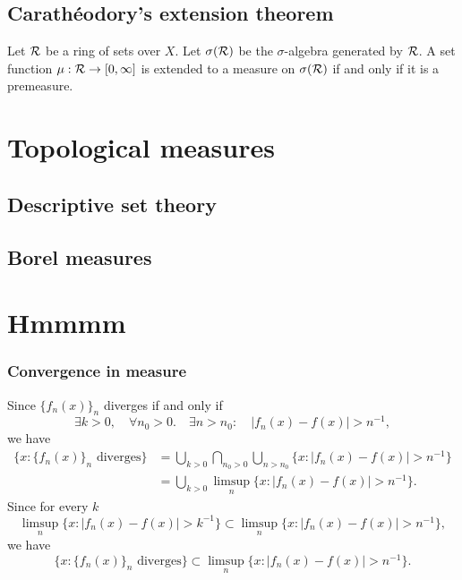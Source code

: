\documentclass{../crs}
\begin{document}
\section{Carath\'eodory's extension theorem}
\begin{thm}
Let $\mathcal{R}$ be a ring of sets over $X$.
Let $\sigma(\mathcal{R})$ be the $\sigma$-algebra generated by $\mathcal{R}$.
A set function $\mu:\cR\to[0,\oo]$ is extended to a measure on $\sigma(\mathcal{R})$ if and only if it is a premeasure.
\end{thm}



\chapter{}





\chapter{Topological measures}

\section{Descriptive set theory}





\section{Borel measures}





\chapter{Hmmmm}

\subsection{Convergence in measure}
Since $\{f_n(x)\}_n$ diverges if and only if
\[\exists k>0,\quad\forall n_0>0.\quad\exists n>n_0:\quad |f_n(x)-f(x)|>n^{-1},\]
we have
\begin{align*}
\{x:\{f_n(x)\}_n\text{ diverges}\}&=\bigcup_{k>0}\bigcap_{n_0>0}\bigcup_{n>n_0}\{x:|f_n(x)-f(x)|>n^{-1}\}\\
&=\bigcup_{k>0}\limsup_n\{x:|f_n(x)-f(x)|>n^{-1}\}.
\end{align*}
Since for every $k$
\[\limsup_n\{x:|f_n(x)-f(x)|>k^{-1}\}\subset\limsup_n\{x:|f_n(x)-f(x)|>n^{-1}\},\]
we have
\[\{x:\{f_n(x)\}_n\text{ diverges}\}\subset\limsup_n\{x:|f_n(x)-f(x)|>n^{-1}\}.\]
\end{document}

